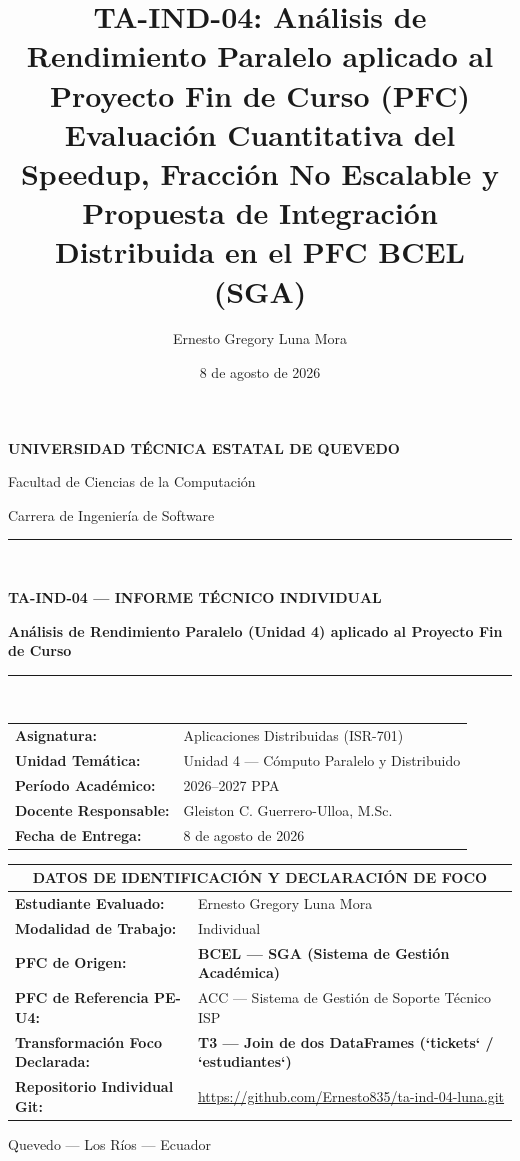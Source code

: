 \documentclass[11pt,a4paper]{article}
\title{TA-IND-04: Análisis de Rendimiento Paralelo aplicado al Proyecto Fin de Curso (PFC)\\[4pt]
\large Evaluación Cuantitativa del Speedup, Fracción No Escalable y Propuesta de Integración Distribuida en el PFC BCEL (SGA)}
\author{Ernesto Gregory Luna Mora}
\date{8 de agosto de 2026}
\begin{document}
\begin{titlepage}
\centering
{\large\bfseries UNIVERSIDAD TÉCNICA ESTATAL DE QUEVEDO\par}
{\large Facultad de Ciencias de la Computación\par}
{\large Carrera de Ingeniería de Software\par}
\vspace{1.0cm}
\rule{0.9\textwidth}{0.6pt}\\[0.4cm]
{\Large\bfseries TA-IND-04 — INFORME TÉCNICO INDIVIDUAL\par}
\vspace{0.2cm}
{\large\bfseries Análisis de Rendimiento Paralelo (Unidad 4) aplicado al Proyecto Fin de Curso\par}
\rule{0.9\textwidth}{0.6pt}\\[0.8cm]

\begin{tabular}{ll}
\textbf{Asignatura:} & Aplicaciones Distribuidas (ISR-701) \\
\textbf{Unidad Temática:} & Unidad 4 — Cómputo Paralelo y Distribuido \\
\textbf{Período Académico:} & 2026–2027 PPA \\
\textbf{Docente Responsable:} & Gleiston C. Guerrero-Ulloa, M.Sc. \\
\textbf{Fecha de Entrega:} & 8 de agosto de 2026 \\
\end{tabular}
\vspace{1.0cm}

\begin{table}[H]
\centering
\begin{tabular}{p{5.5cm}p{9.0cm}}
\toprule
\multicolumn{2}{c}{\textbf{DATOS DE IDENTIFICACIÓN Y DECLARACIÓN DE FOCO}} \\
\midrule
\textbf{Estudiante Evaluado:} & Ernesto Gregory Luna Mora \\
\textbf{Modalidad de Trabajo:} & Individual \\
\textbf{PFC de Origen:} & \textbf{BCEL — SGA (Sistema de Gestión Académica)} \\
\textbf{PFC de Referencia PE-U4:} & ACC — Sistema de Gestión de Soporte Técnico ISP \\
\textbf{Transformación Foco Declarada:} & \textbf{T3 — Join de dos DataFrames (`tickets` / `estudiantes`)} \\
\textbf{Repositorio Individual Git:} & \url{https://github.com/Ernesto835/ta-ind-04-luna.git} \\
\bottomrule
\end{tabular}
\end{table}

\vfill
{\small Quevedo — Los Ríos — Ecuador}
\end{titlepage}
\end{document}
